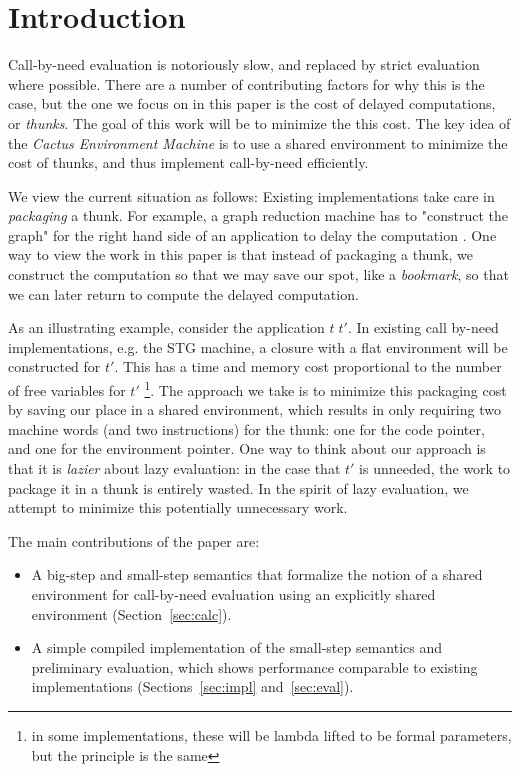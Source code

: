\section{Introduction}

Call-by-need evaluation is notoriously slow, and replaced by strict evaluation
where possible\cite{burn1986strictness}. There are a number of contributing
factors for why this is the case, but the one we focus on in this paper is the
cost of delayed computations, or \emph{thunks}. The goal of this work will be to
minimize the this cost. The key idea of the \emph{Cactus Environment Machine} is
to use a shared environment to minimize the cost of thunks, and thus implement
call-by-need efficiently. 

We view the current situation as follows: Existing implementations take care in
\emph{packaging} a thunk. For example, a graph reduction machine has to
"construct the graph" for the right hand side of an application to delay the
computation \cite{landin1964mechanical}. One way to view the work in this paper
is that instead of packaging a thunk, we construct the computation so that we
may save our spot, like a \emph{bookmark}, so that we can later return to
compute the delayed computation. 

As an illustrating example, consider the application $t \; t'$. In existing call
by-need implementations, e.g. the STG machine, a closure with a flat environment
will be constructed for $t'$.  This has a time and memory cost proportional to
the number of free variables for $t'$ \footnote{in some implementations, these
will be lambda lifted to be formal parameters, but the principle is the same}.
The approach we take is to minimize this packaging cost by saving our place in a
shared environment, which results in only requiring two machine words (and two
instructions) for the thunk: one for the code pointer, and one for the
environment pointer. One way to think about our approach is that it is
\emph{lazier} about lazy evaluation: in the case that $t'$ is unneeded, the work
to package it in a thunk is entirely wasted. In the spirit of lazy evaluation,
we attempt to minimize this potentially unnecessary work.  

The main contributions of the paper are:
\begin{itemize}
\item A big-step and small-step semantics that formalize the notion of a shared
environment for call-by-need evaluation using an explicitly shared environment
(Section~\ref{sec:calc}).
\item A simple compiled implementation of the small-step semantics and
preliminary evaluation, which shows performance comparable to existing
implementations (Sections~\ref{sec:impl} and~\ref{sec:eval}).
\end{itemize}

